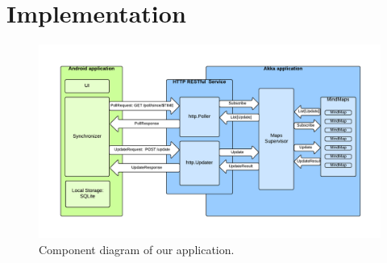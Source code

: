 %
%
%
%
%

\chapter{Implementation}
\label{chap:implementation}

\begin{figure}[h]
	\centering
	\includegraphics[width=\textwidth]{component-diagram}
	\caption{Component diagram of our application.}
	\label{fig:screen-map}
\end{figure}






